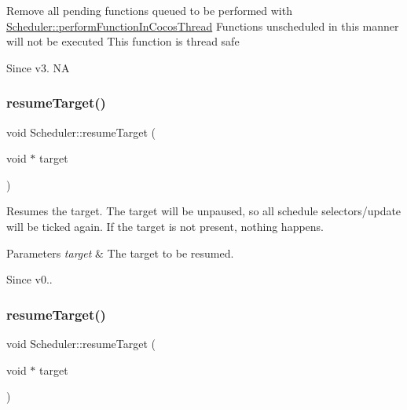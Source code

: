 Remove all pending functions queued to be performed with \hyperlink{classScheduler_acd6da28a03a7f8b9df377f1e05e7883f}{Scheduler\+::perform\+Function\+In\+Cocos\+Thread} Functions unscheduled in this manner will not be executed This function is thread safe \begin{DoxySince}{Since}
v3.  NA 
\end{DoxySince}
\mbox{\label{classScheduler_aebdab814dbc692356f813d335c3b92af}} 
\subsubsection{\texorpdfstring{resume\+Target()}{resumeTarget()}\hspace{0.1cm}{\footnotesize\ttfamily [1/2]}}
{\footnotesize\ttfamily void Scheduler\+::resume\+Target (\begin{DoxyParamCaption}\item[{void $\ast$}]{target }\end{DoxyParamCaption})}

Resumes the target. The \textquotesingle{}target\textquotesingle{} will be unpaused, so all schedule selectors/update will be \textquotesingle{}ticked\textquotesingle{} again. If the target is not present, nothing happens. 
\begin{DoxyParams}{Parameters}
{\em target} & The target to be resumed. \\
\hline
\end{DoxyParams}
\begin{DoxySince}{Since}
v0.. 
\end{DoxySince}
\mbox{\label{classScheduler_aebdab814dbc692356f813d335c3b92af}} 
\subsubsection{\texorpdfstring{resume\+Target()}{resumeTarget()}\hspace{0.1cm}{\footnotesize\ttfamily [2/2]}}
{\footnotesize\ttfamily void Scheduler\+::resume\+Target (\begin{DoxyParamCaption}\item[{void $\ast$}]{target }\end{DoxyParamCaption})}

